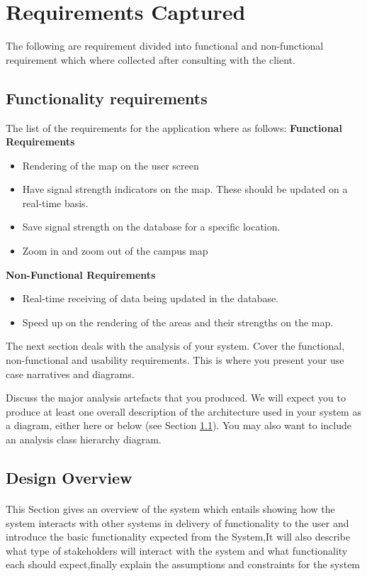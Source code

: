 \section{Requirements Captured}
The following are requirement divided into functional and non-functional requirement which where collected after consulting with the client.
\subsection*{Functionality requirements}
The list of the requirements for the application where as follows:
\newline\textbf{Functional Requirements}
\begin{itemize}
	\item Rendering of the map on the user screen
	\item Have signal strength indicators on the map. These should be updated on a real-time basis.
	\item Save signal strength on the database for a specific location.
	\item Zoom in and zoom out of the campus map
\end{itemize}
\textbf{Non-Functional Requirements}
\begin{itemize}
	\item Real-time receiving of data being updated in the database.
	\item Speed up on the rendering of the areas and their strengths on the map.
\end{itemize}



The next section deals with the analysis of your system. Cover the
functional, non-functional and usability requirements. This is where
you present your use case narratives and diagrams. 

Discuss the major analysis artefacts that you produced. We will expect
you to produce at least one overall description of the architecture
used in your system as a diagram, either here or below (see Section
\ref{ss:design-overview}). You may also want to include an analysis
class hierarchy diagram.

\subsection{Design Overview}
\label{ss:design-overview}
\paragraph{}This Section gives an overview of the system which entails showing how the system interacts with other systems in delivery of functionality to the user and introduce the basic functionality expected from the System,It will also describe what type of stakeholders will interact with the system and what functionality each should expect,finally explain the assumptions and constraints for the system 

